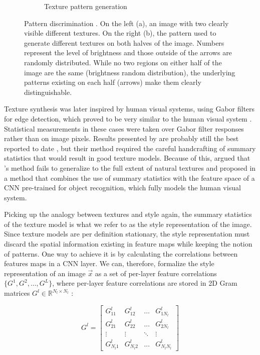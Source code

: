 \begin{figure}[t]
\begin{subfigure}[b]{0.5\textwidth}
    \caption{Texture pattern generation}
    \label{sub:system:method:style-reconstruction:texture-2}
  \end{subfigure}
  \caption{Pattern discrimination \cite{Julesz1962}.
    On the left (a), an image with two clearly visible different textures.
    On the right (b), the pattern used to generate different textures on both halves of the image.
    Numbers represent the level of brightness and those outside of the arrows are randomly distributed.
    While no two regions on either half of the image are the same (brightness random distribution), the underlying patterns existing on each half (arrows) make them clearly distinguishable.}
  \label{sub:system:method:style-reconstruction:texture}
\end{figure}

Texture synthesis was later inspired by human visual systems, using Gabor filters for edge detection, which proved to be very similar to the human visual system \cite{Heeger1995,Portilla2000}.
Statistical measurements in these cases were taken over Gabor filter responses rather than on image pixels.
Results presented by \citet{Portilla2000} are probably still the best reported to date \cite{Gatys2015A}, but their method required the careful handcrafting of summary statistics that would result in good texture models.
Because of this, \citeauthor{Gatys2015A} argued that \citeauthor{Portilla2000}'s method fails to generalize to the full extent of natural textures and proposed in \cite{Gatys2015A} a method that combines the use of summary statistics with the feature space of a CNN pre-trained for object recognition, which fully models the human visual system.

Picking up the analogy between textures and style again, the summary statistics of the texture model is what we refer to as the style representation of the image.
Since texture models are per definition stationary, the style representation must discard the spatial information existing in feature maps while keeping the notion of patterns.
One way to achieve it is by calculating the correlations between features maps in a CNN layer.
We can, therefore, formalize the style representation of an image $\vec{x}$ as a set of per-layer feature correlations $\{G^1, G^2, \dots, G^L\}$, where per-layer feature correlations are stored in 2D Gram matrices $G^l \in \mathbb{R}^{{N_l}\times{N_l}}$ \cite[Theorem~7.2.10]{Horn2012}:

\begin{equation}
  G^l =
  \begin{bmatrix}
    G^l_{11}   & G^l_{12}   & \dots  & G^l_{1N_l} \\
    G^l_{21}   & G^l_{22}   & \dots  & G^l_{2N_l} \\
    \vdots     & \vdots     & \ddots & \vdots   \\
    G^l_{N_l1} & G^l_{N_l2} & \dots  & G^l_{N_lN_l}
  \end{bmatrix}
\end{equation}

